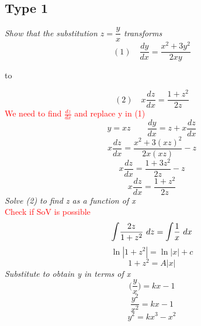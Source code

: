 \documentclass{article}[18pt]
\begin{document}
\subsection{Type 1}
\textit{Show that the substitution $z=\dfrac{y}{x}$ transforms}
$$(1)\quad \frac{dy}{dx}=\frac{x^2+3y^2}{2xy}$$
\begin{center}
to
\end{center}
$$(2)\quad x\frac{dz}{dx}=\frac{1+z^2}{2z}$$
\textcolor{red}{We need to find $\frac{dz}{dx}$ and replace y in (1)}\\
$$y=xz \quad \quad \frac{dy}{dx}=z+x\frac{dz}{dx}$$
$$x\frac{dz}{dx}=\frac{x^2+3(xz)^2}{2x(xz)}-z$$
$$x\frac{dz}{dx}=\frac{1+3z^2}{2z}-z$$
$$x\frac{dz}{dx}=\frac{1+z^2}{2z}$$
\textit{Solve (2) to find z as a function of x}\\
\textcolor{red}{Check if SoV is possible}\\
$$\mathlarger{\int}\frac{2z}{1+z^2} \ dz=\mathlarger{\int}\frac{1}{x} \ dx$$
$$\ln|1+z^2|=\ln|x|+c$$
$$1+z^2=A|x|$$
\textit{Substitute to obtain y in terms of x}\\
$$\Bigg(\frac{y}{x}\Bigg)=kx-1$$
$$\frac{y^2}{x^2}=kx-1$$
$$y^2=kx^3-x^2$$
\end{document}
